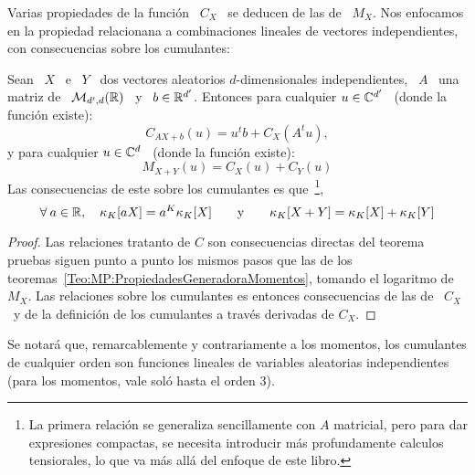 {Varias propiedades de la  funci\'on \ $C_X$ \ se deducen de  las de \ $M_X$. Nos
enfocamos  en la  propiedad  relacionana a  combinaciones  lineales de  vectores
independientes, con consecuencias sobre los cumulantes:
%
\begin{teorema}%
\label{Teo:MP:PropiedadesGeneradoraCumulantes}
%
  Sean  \   $X$  \  e  \   $Y$  \  dos   vectores  aleatorios  $d$-dimensionales
  independientes,  \ $A$  \ una  matriz de  \ $\mathcal{M}_{d',d}(\mathbb{R})$  \ y  \  $b \in
  \mathbb{R}^{d'}$.  Entonces para cualquier $u \in \mathbb{C}^{d'}$ \ (donde la funci\'on
  existe):
  \[
  C_{A X + b}(u) =  u^t b +  C_X\left( A^t u \right),
  \]
  y para cualquier $u \in \mathbb{C}^d$ \ (donde la funci\'on existe):
  \[
  M_{X+Y}(u) = C_X(u) + C_Y(u)
  \]
  Las  consecuencias de este  sobre los  cumulantes es  que~\footnote{La primera
    relaci\'on  se generaliza  sencillamente con  $A$ matricial,  pero  para dar
    expresiones compactas,  se necesita introducir  m\'as profundamente calculos
    tensiorales, lo  que va  m\'as all\'a del  enfoque de este  libro.},
  \[
  \forall \: a \in \mathbb{R}, \quad \kappa_K[a X] = a^K \kappa_K[X] \qquad \mbox{y}
  \qquad \kappa_K[X+Y] = \kappa_K[X] + \kappa_K[Y]
  \]
\end{teorema}
%
\begin{proof}
  Las relaciones tratanto de $C$  son consecuencias directas del teorema pruebas
  siguen    punto   a    punto   los    mismos    pasos   que    las   de    los
  teoremas~\ref{Teo:MP:PropiedadesGeneradoraMomentos}, tomando el logaritmo de \
  $M_X$. Las relaciones sobre los cumulantes es entonces consecuencias de las de
  \  $C_X$ \ y  de la  definici\'on de  los cumulantes  a trav\'es  derivadas de
  $C_X$.
\end{proof}
%
Se notar\'a que, remarcablemente y contrariamente a los momentos, los cumulantes
de cualquier orden son funciones lineales de variables aleatorias independientes
(para los momentos, vale sol\'o hasta el orden $3$).  }




\vspace{2cm}

\centerline{\underline{\hspace{10cm}}}




